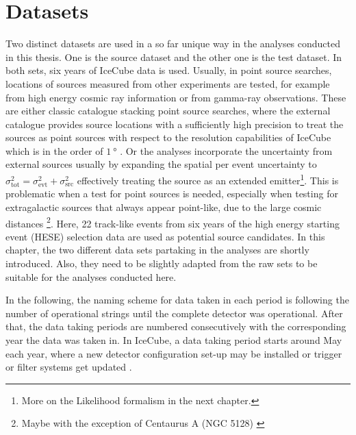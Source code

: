 \chapter{Datasets}
  \label{chp:datasets}

Two distinct datasets are used in a so far unique way in the analyses conducted in this thesis.
One is the source dataset and the other one is the test dataset.
In both sets, six years of IceCube data is used.
Usually, in point source searches, locations of sources measured from other experiments are tested, for example from high energy cosmic ray information or from gamma-ray observations.
These are either classic catalogue stacking point source searches, where the external catalogue provides source locations with a sufficiently high precision to treat the sources as point sources with respect to the resolution capabilities of IceCube which is in the order of $\SI{1}{\degree}$ \cite{Aartsen:2013zka,Bos:2015SunMoon}.
Or the analyses incorporate the uncertainty from external sources usually by expanding the spatial per event uncertainty to $\sigma_\text{tot}^2 = \sigma_\text{evt}^2 + \sigma_\text{src}^2$ effectively treating the source as an extended emitter\footnote{More on the Likelihood formalism in the next chapter.}.
This is problematic when a test for point sources is needed, especially when testing for extragalactic sources that always appear point-like, due to the large cosmic distances \footnote{Maybe with the exception of Centaurus A (NGC 5128) \cite{Yang:2012CentaurusA}}.
Here, 22 track-like events from six years of the high energy starting event (HESE) selection data are used as potential source candidates.
In this chapter, the two different data sets partaking in the analyses are shortly introduced.
Also, they need to be slightly adapted from the raw sets to be suitable for the analyses conducted here.

In the following, the naming scheme for data taken in each period is following the number of operational strings until the complete detector was operational.
After that, the data taking periods are numbered consecutively with the corresponding year the data was taken in.
In IceCube, a data taking period starts around May each year, where a new detector configuration set-up may be installed or trigger or filter systems get updated \cite{Aartsen:2016nxy}.

